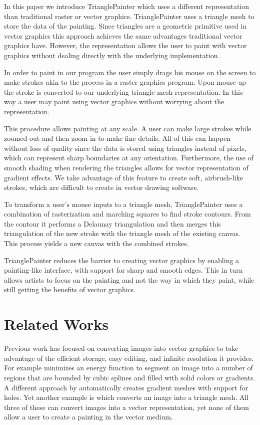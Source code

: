 \documentclass[review]{acmsiggraph}
\begin{document}
In this paper we introduce TrianglePainter which  
uses a different representation than traditional raster or vector graphics.
TrianglePainter uses a triangle mesh to store the data of the painting.
Since triangles are a geometric primitive used in vector graphics this approach achieves the
same advantages traditional vector graphics have. However, the representation allows the
user to paint with vector graphics without dealing directly with the underlying implementation.

In order to paint in our program the user simply drags his mouse on the screen to make
strokes akin to the process in a raster graphics program. Upon mouse-up the stroke is
converted to our underlying triangle mesh representation. In this way a user may paint using
vector graphics without worrying about the representation.

This procedure allows painting at any scale. A user can make large strokes
while zoomed out and then zoom in to make fine details. All of this can happen without
loss of quality since the data is stored using triangles instead of pixels, which can represent sharp boundaries at any orientation.  Furthermore, the use of smooth shading when rendering the triangles allows for vector representation of gradient effects.  We take advantage of this feature to create soft, airbrush-like strokes, which are difficult to create in vector drawing software.

To transform a user's mouse inputs to a triangle mesh,
TrianglePainter uses a combination of rasterization and marching squares to
find stroke contours. From the contour it performs a Delaunay triangulation
and then merges this triangulation
of the new stroke with the triangle mesh of the existing canvas. This process yields
a new canvas with the combined strokes.

TrianglePainter reduces the barrier to creating vector graphics by enabling a painting-like interface, with support for sharp and smooth edges. This in turn allows 
artists to focus on the painting and not the way in which they paint, while still 
getting the benefits of vector graphics.

\section{Related Works}

Previous work has focused on converting images into vector graphics to take advantage of the
efficient storage, easy editing, and infinite resolution it provides. For example \cite{lecot:ARD:2006}
minimizes an energy function to segment an image into a number of regions that are bounded
by cubic splines and filled with solid colors or gradients. A different approach by \cite{Lai:2009:ATG:1531326.1531391} 
automatically creates gradient meshes with support for holes. Yet another example is \cite{10.1109/TVCG.2012.76} 
which converts an image into a triangle mesh. All three of these can convert images into
a vector representation, yet none of them allow a user to create a painting in the vector medium.
\end{document}
